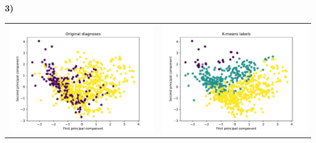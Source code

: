 \documentclass[11pt,a4paper]{article}
\begin{document}
\begin{flushleft}
  \textbf{3)}
  \begin{tabularx}{1.09\textwidth} {X X}
    \vspace{-4mm}\hspace{-7.5mm}\includegraphics[scale=0.6]{hw04_plot_pca_km1.pdf}
     &
    \vspace{-4mm}\hspace{-5.25mm}\includegraphics[scale=0.6]{hw04_plot_pca_km2.pdf}
  \end{tabularx}
\end{flushleft}
\end{document}
